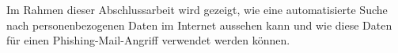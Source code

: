\label{cha:abtract} 
Im Rahmen dieser Abschlussarbeit wird gezeigt, wie eine automatisierte Suche nach personenbezogenen Daten im Internet aussehen kann und wie diese Daten für einen Phishing-Mail-Angriff verwendet werden können. 






